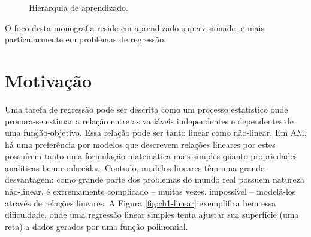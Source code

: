 \begin{figure}[H]
    \caption{Hierarquia de aprendizado.}
    \label{fig:ch1-1}
    \def\gap{13mm}
    \centering
    \begin{center}
    \end{center}
\end{figure}

O foco desta monografia reside em aprendizado supervisionado, e mais particularmente em problemas de regressão.

\section{Motivação}

Uma tarefa de regressão pode ser descrita como um processo estatístico onde procura-se estimar a relação entre as variáveis independentes e dependentes de uma função-objetivo. Essa relação pode ser tanto linear como não-linear. Em AM, há uma preferência por modelos que descrevem relações lineares por estes possuírem tanto uma formulação matemática mais simples quanto propriedades analíticas bem conhecidas. Contudo, modelos lineares têm uma grande desvantagem: como grande parte dos problemas do mundo real possuem natureza não-linear, é extremamente complicado -- muitas vezes, impossível -- modelá-los através de relações lineares. A Figura \ref{fig:ch1-linear} exemplifica bem essa dificuldade, onde uma regressão linear simples tenta ajustar sua superfície (uma reta) a dados gerados por uma função polinomial.

